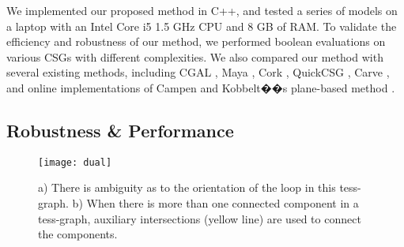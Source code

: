 
We implemented our proposed method in C++, and tested a series of models on a laptop with an Intel Core i5 1.5 GHz CPU and 8 GB of RAM. To validate the efficiency and robustness of our method, we performed boolean evaluations on various CSGs with different complexities. We also compared our method with several existing methods, including CGAL \cite{cgal:hk-bonp3-15a}, Maya \cite{Maya2015,barki2015exact}, Cork  \cite{Cork}, QuickCSG \cite{douze2015quickcsg}, Carve \cite{Carve}, and online implementations of Campen and Kobbelt��s plane-based method \cite{campen2010exact,WebBSP}.



\subsection{Robustness \& Performance}



\begin{figure}[t]
\centering
\texttt{[image: dual]}
\caption{a) There is ambiguity as to the orientation of the loop in this tess-graph. b) When there is more than one connected component in a tess-graph, auxiliary intersections (yellow line) are used to connect the components.}
\label{fig:dual}
\end{figure}



